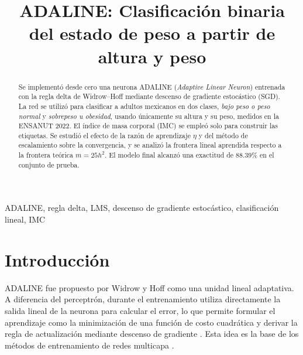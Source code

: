 \documentclass[conference]{IEEEtran}
\begin{document}
\title{ADALINE: Clasificación binaria del estado de peso a partir de altura y peso}

\author{
}

\maketitle

\begin{abstract}
    Se implementó desde cero una neurona ADALINE (\textit{Adaptive Linear Neuron})
    entrenada con la regla delta de Widrow--Hoff mediante descenso de gradiente
    estocástico (SGD). La red se utilizó para clasificar a adultos mexicanos en
    dos clases, \textit{bajo peso o peso normal} y \textit{sobrepeso u obesidad},
    usando únicamente su altura y su peso, medidos en la ENSANUT 2022. El índice de masa corporal (IMC)
    se empleó solo para construir las etiquetas. Se estudió el efecto de la razón de
    aprendizaje $\eta$ y del método de escalamiento sobre la convergencia, y se
    analizó la frontera lineal aprendida respecto a la frontera teórica
    $m=25h^2$. El modelo final alcanzó una exactitud de $88.39\%$ en el
    conjunto de prueba.
\end{abstract}

\begin{IEEEkeywords}
ADALINE, regla delta, LMS, descenso de gradiente estocástico, clasificación lineal, IMC
\end{IEEEkeywords}

\section{Introducción}
ADALINE fue propuesto por Widrow y Hoff como una unidad lineal adaptativa. A
diferencia del perceptrón, durante el entrenamiento utiliza directamente la
salida lineal de la neurona para calcular el error, lo que permite formular el
aprendizaje como la minimización de una función de costo cuadrática y derivar
la regla de actualización mediante descenso de gradiente
\cite{b1,b2,b3}. Esta idea es la base de los métodos de entrenamiento de
redes multicapa \cite{b4}.
\end{document}
